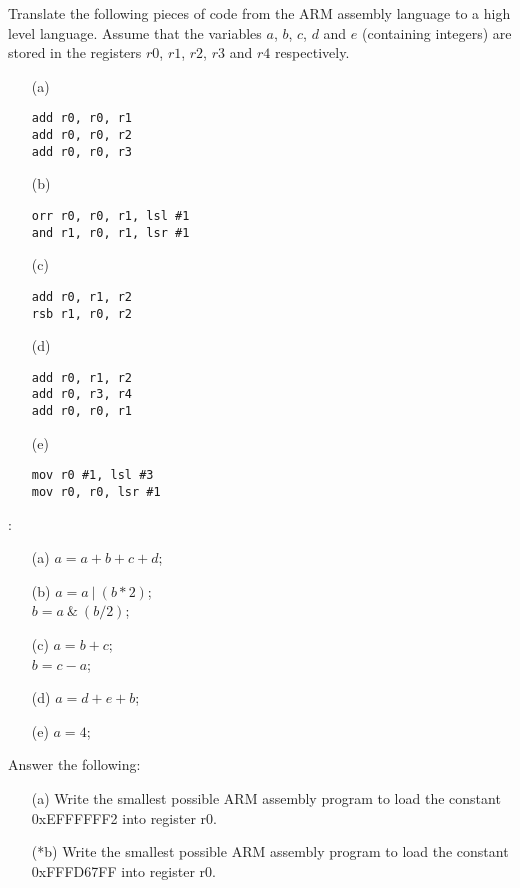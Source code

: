 \begin{ExerciseList}
\Exercise
Translate the following pieces of code from the 
ARM assembly language to a high level language.
Assume that the variables $a$, $b$, $c$, $d$ and $e$ (containing integers)
are stored in the registers $r0$, $r1$, $r2$, $r3$ and $r4$ respectively.

\begin{enumerate}
\item[(a) ] 
\begin{Verbatim}[frame=single]
add r0, r0, r1
add r0, r0, r2
add r0, r0, r3
\end{Verbatim}
\item[(b) ]
\begin{Verbatim}[frame=single]
orr r0, r0, r1, lsl #1
and r1, r0, r1, lsr #1
\end{Verbatim}
\item[(c) ]
\begin{Verbatim}[frame=single]
add r0, r1, r2
rsb r1, r0, r2
\end{Verbatim}
\item[(d) ]
\begin{Verbatim}[frame=single]
add r0, r1, r2
add r0, r3, r4
add r0, r0, r1
\end{Verbatim}
\item[(e) ]
\begin{Verbatim}[frame=single]
mov r0 #1, lsl #3
mov r0, r0, lsr #1
\end{Verbatim}
\end{enumerate}


\Answer:
\begin{enumerate}
\item[(a) ]
$a=a+b+c+d$;
\item[(b) ]
$a=a\:|\:(b*2)$;\\
$b=a\:\&\:(b/2)$;
\item[(c) ]
$a=b+c$; \\
$b=c-a$;
\item[(d) ]
$a=d+e+b$;
\item[(e) ]
$a=4$;
\end{enumerate}



\Exercise Answer the following:
\begin{enumerate}
\item[(a) ] Write the smallest possible ARM assembly program to load the constant 0xEFFFFFF2 into register
r0.
\item[(*b) ] Write the smallest possible ARM assembly program to load the constant 0xFFFD67FF into register
r0.
\end{enumerate}


\end{ExerciseList}
